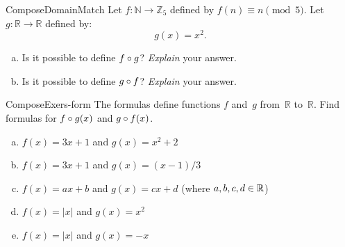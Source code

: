 \begin{exercise}{ComposeDomainMatch}
Let $f \colon \mathbb{N} \to \mathbb{Z}_5$ defined by 
$f(n) \equiv  n \pmod{5}$.
\noindent
Let $g \colon \mathbb{R} \to \mathbb{R}$ defined by:
$$g(x) = x^2.$$

\begin{enumerate}[(a)]
\item
Is it possible to define $f \circ g$? \emph{Explain} your answer.
\item
Is it possible to define $g \circ f$? \emph{Explain} your answer.
\end{enumerate}
\end{exercise}

\begin{exercise}{ComposeExers-form} 
 The formulas define functions $f$ and~$g$ from~$\mathbb{R}$ to~$\mathbb{R}$. Find formulas for $f \circ g(x)$ and $g \circ f(x)$.
\begin{enumerate}[(a)]
\item \label{ComposeExers-form-(3x+1)(x2+2)}
 $f(x) = 3x + 1$ and $g(x) = x^2 + 2$ 
\item \label{ComposeExers-form-(3x+1)(x-1/3)}
 $f(x) = 3x + 1$ and $g(x) = (x-1)/3$ 
\item \label{ComposeExers-form-(ax+b)(cx+d)}
 $f(x) = ax + b$ and $g(x) = c x + d$ (where $a,b,c,d \in \mathbb{R}$)
\item \label{ComposeExers-form-(|x|)(x2)}
 $f(x) = |x|$ and $g(x) = x^2$ 
\item \label{ComposeExers-form-(|x|)(-x)}
 $f(x) = |x|$ and $g(x) = -x$ 
\end{enumerate}
\end{exercise}


